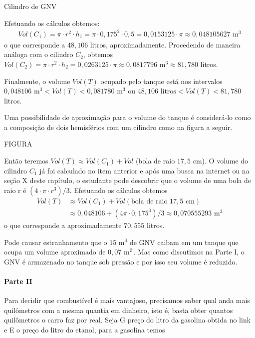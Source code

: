 \begin{answer}{Cilindro de GNV}
{
Efetuando os cálculos obtemos:
\begin{equation*}
\begin{split}Vol(C_1) = \pi \cdot r^2 \cdot h_1 = \pi\cdot0{,}175^2\cdot 0{,}5 = 0{,}0153125\cdot\pi \approx 0{,}048105627\text{ m}^3
\end{split}
\end{equation*}
o que corresponde a $48{,}106$ litros, aproximadamente. Procedendo de maneira análoga com o cilindro \(C_2\), obtemos \(Vol(C_2) = \pi\cdot r^2 \cdot h_2 = 0{,}0263125 \cdot \pi \approx 0{,}0817796\text{ m}^3 \approx 81,780\) litros.

Finalmente, o volume $Vol(T)$ ocupado pelo tanque está nos intervalos $0{,}048106\text{ m}^3 < Vol(T) < 0{,}081780\text{ m}^3$ ou $48{,}106\text{ litros} < Vol(T) < 81{,}780$ litros.

Uma possibilidade de aproximação para o volume do tanque é considerá-lo como a composição de dois hemisférios com um cilindro como na figura a seguir.

FIGURA

Então teremos \(Vol(T) \approx Vol(C_1) + Vol\) (bola de raio $17{,}5$ cm). O volume do cilindro \(C_1\) já foi calculado no item anterior e após uma busca na internet ou na seção X deste capítulo, o estudante pode descobrir que o volume de uma bola de raio r é \((4 \cdot \pi \cdot r^3)/3\). Efetuando os cálculos obtemos
\begin{align*}
Vol(T) & \approx Vol(C_1) + Vol(\text{bola de raio } 17{,}5\text{ cm}) \\
& \approx 0{,}048106 + (4 \pi \cdot 0{,}175^3)/3 \approx 0{,}070555293\text{ m}^3
\end{align*}
o que corresponde a aproximadamente $70{,}555$ litros.

Pode causar estranhamento que o $15$ m$^3$ de GNV caibam em um tanque que ocupa um volume aproximado de $0{,}07$ m\(\sp{\text{3}}\). Mas como discutimos na Parte I, o GNV é armazenado no tanque sob pressão e por isso seu volume é reduzido.

\paragraph{Parte II}

Para decidir que combustível é mais vantajoso, precisamos saber qual anda mais quilômetros com a mesma quantia em dinheiro, isto é, basta obter quantos quilômetros o carro faz por real. Seja G preço do litro da gasolina obtida no link e E o preço do litro do etanol, para a gasolina temos

}
\end{answer}

